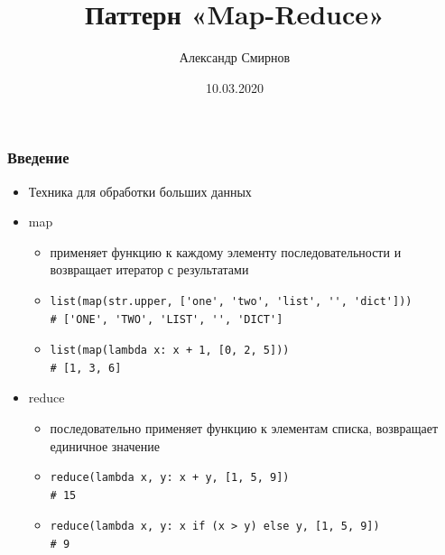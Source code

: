 \documentclass[xetex,mathserif,serif]{beamer}
\title{Паттерн «Map-Reduce»}
\author[Александр Смирнов]{Александр Смирнов}
\date{10.03.2020}
\begin{document}
\begin{frame}
	\titlepage{}
\end{frame}

\begin{frame}[fragile]

	\frametitle{Введение}

	\begin{itemize}
		\item Техника для обработки больших данных
		\item map
		      \begin{itemize}
			      \item применяет функцию к каждому элементу последовательности и возвращает итератор с результатами
			      \item
			            \begin{verbatim}
list(map(str.upper, ['one', 'two', 'list', '', 'dict']))
# ['ONE', 'TWO', 'LIST', '', 'DICT']

                        \end{verbatim}
			      \item
			            \begin{verbatim}
list(map(lambda x: x + 1, [0, 2, 5]))
# [1, 3, 6]

                        \end{verbatim}
		      \end{itemize}
		\item reduce
		      \begin{itemize}
			      \item последовательно применяет функцию к элементам списка, возвращает единичное значение
			      \item
			            \begin{verbatim}
reduce(lambda x, y: x + y, [1, 5, 9])
# 15

                        \end{verbatim}
			      \item
			            \begin{verbatim}
reduce(lambda x, y: x if (x > y) else y, [1, 5, 9])
# 9

                        \end{verbatim}
		      \end{itemize}
	\end{itemize}
\end{frame}
\end{document}
